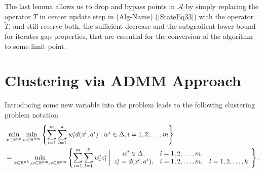 \documentclass[11pt]{article}
\numberwithin{equation}{section}
\begin{document}
The last lemma allows us to drop  and bypass points in $\mathcal{A}$ by simply replacing the operator $T$ in center update step in (Alg-Name) (\ref{StateEq33}) with the operator $\tilde{T}$, and still reserve both, the sufficient decrease and the subgradient lower bound for iterates gap properties, that are essential for the conversion of the algorithm to some limit point.
\newpage

\section{Clustering via ADMM Approach}
Introducing some new variable into the problem leads to the following clustering problem notation
\begin{equation*}
\begin{split}
	&\min\limits_{x \in \mathbb{R}^{nk}} \min\limits_{w \in \mathbb{R}^{km}} \left\lbrace \sum\limits_{i=1}^{m} \sum\limits_{l=1}^{k} w^i_l d(x^l,a^i) \mid w^i \in \Delta, i=1,2, \ldots, m \right\rbrace \\
	&= \min\limits_{x \in \mathbb{R}^{nk}, w \in \mathbb{R}^{km}, z \in \mathbb{R}^{km}} \left\lbrace \sum\limits_{i=1}^{m} \sum\limits_{l=1}^{k} w^i_l z^i_l \: \bigg| 
\begin{array}{c c c}
 w^i \in \Delta, & i=1,2, \ldots, m, & \\
 z^i_l = d(x^l,a^i), & i=1,2, \ldots, m, & l=1,2, \ldots, k
\end{array}
\right\rbrace .
\end{split}
\end{equation*}
\end{document}
